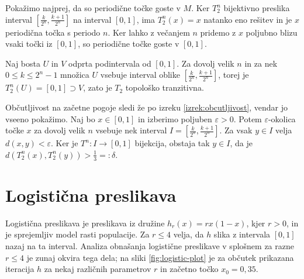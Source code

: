\documentclass{isrmdelo}
\begin{document}
\begin{dokaz}
Pokažimo najprej, da so periodične točke goste v $M$. Ker $T_2^n$ bijektivno preslika interval $[\frac{k}{2^n}, \frac{k+1}{2^n}]$ na interval $[0,1]$, ima $T_2^n(x) = x$ natanko eno rešitev in je $x$ periodična točka s periodo $n$. Ker lahko z večanjem $n$ pridemo z $x$ poljubno blizu vsaki točki iz $[0,1]$, so periodične točke goste v $[0,1]$.

Naj bosta $U$ in $V$ odprta podintervala od $[0,1]$. Za dovolj velik $n$ in za nek $0 \leq k \leq 2^n - 1$ množica $U$ vsebuje interval oblike $[\frac{k}{2^n}, \frac{k+1}{2^n}]$, torej je $T_2^n(U) = [0,1] \supset V$, zato je $T_2$ topološko tranzitivna.

Občutljivost na začetne pogoje sledi že po izreku \ref{izrek:obcutljivost}, vendar jo vseeno pokažimo. Naj bo $x \in [0,1]$ in izberimo poljuben $\varepsilon > 0$. Potem $\varepsilon$-okolica točke $x$ za dovolj velik $n$ vsebuje nek interval $I = [\frac{k}{2^n}, \frac{k+1}{2^n}]$. Za vsak $y \in I$ velja $d(x,y) < \varepsilon$. Ker je $T^n: I \rightarrow [0,1]$ bijekcija, obstaja tak $y \in I$, da je $d(T_2^n(x), T_2^n(y)) > \frac{1}{3} =: \delta$. \qedhere
\end{dokaz}

\section{Logistična preslikava}

Logistična preslikava je preslikava iz družine $h_r(x) = r x (1-x)$, kjer $r > 0$, in je sprejemljiv model rasti populacije. Za $r \leq 4$ velja, da $h$ slika z intervala $[0,1]$ nazaj na ta interval. Analiza obnašanja logistične preslikave v splošnem za razne $r \leq 4$ je zunaj okvira tega dela; na sliki \ref{fig:logistic-plot} je za občutek prikazana iteracija $h$ za nekaj različnih parametrov $r$ in začetno točko $x_0 = 0{,}35$. 
\end{document}

